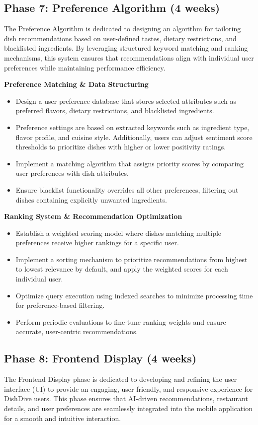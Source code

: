 \subsection*{Phase 7: Preference Algorithm (4 weeks)}
The Preference Algorithm is dedicated to designing an algorithm for tailoring dish recommendations based on user-defined tastes, dietary restrictions, and blacklisted ingredients. By leveraging structured keyword matching and ranking mechanisms, this system ensures that recommendations align with individual user preferences while maintaining performance efficiency.

\textbf{Preference Matching \& Data Structuring}
\begin{itemize}
\item Design a user preference database that stores selected attributes such as preferred flavors, dietary restrictions, and blacklisted ingredients.
\item Preference settings are based on extracted keywords such as ingredient type, flavor profile, and cuisine style. Additionally, users can adjust sentiment score thresholds to prioritize dishes with higher or lower positivity ratings.
\item Implement a matching algorithm that assigns priority scores by comparing user preferences with dish attributes.
\item Ensure blacklist functionality overrides all other preferences, filtering out dishes containing explicitly unwanted ingredients.
\end{itemize}

\textbf{Ranking System \& Recommendation Optimization}
\begin{itemize}
\item Establish a weighted scoring model where dishes matching multiple preferences receive higher rankings for a specific user.
\item Implement a sorting mechanism to prioritize recommendations from highest to lowest relevance by default, and apply the weighted scores for each individual user.
\item Optimize query execution using indexed searches to minimize processing time for preference-based filtering.
\item Perform periodic evaluations to fine-tune ranking weights and ensure accurate, user-centric recommendations.
\end{itemize}

\subsection*{Phase 8: Frontend Display (4 weeks)}
The Frontend Display phase is dedicated to developing and refining the user interface (UI) to provide an engaging, user-friendly, and responsive experience for DishDive users. This phase ensures that AI-driven recommendations, restaurant details, and user preferences are seamlessly integrated into the mobile application for a smooth and intuitive interaction.

